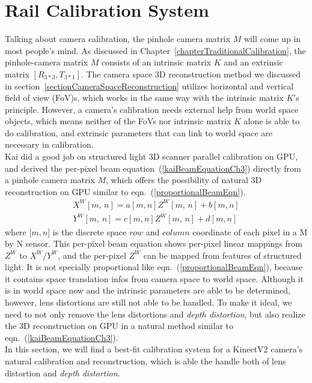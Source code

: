 \section{Rail Calibration System}
\label{sectionRailCalibrationSystem}
Talking about camera calibration, the pinhole camera matrix \(M\) will come up in most people's mind. As discussed in Chapter~\ref{chapterTraditionalCalibration}, the pinhole-camera matrix \(M\) consists of an intrinsic matrix \(K\) and an extrinsic matrix \([R_{3*3}, T_{3*1}]\). The camera space 3D reconstruction method we discussed in section~\ref{sectionCameraSpaceReconstruction} utilizes horizontal and vertical field of view (FoV)s, which works in the same way with the intrinsic matrix \(K\)'s principle. However, a camera's calibration needs external help from world space objects, which means neither of the FoVs nor intrinsic matrix \(K\) alone is able to do calibration,  and extrinsic parameters that can link to world space are necessary in calibration. 
\\\indent
Kai \cite{Kai10} did a good job on structured light 3D scanner parallel calibration on GPU, and derived the per-pixel beam equation~(\ref{kaiBeamEquationCh3}) directly from a pinhole camera matrix \(M\), which offers the possibility of natural 3D reconstruction on GPU similar to eqn.~(\ref{proportionalBeamEqn}).
%
\begin{equation}
\begin{aligned}
X^W[m,\,  n] = a[m, n]Z^W[m,\,  n]+b[m, n]
\\%
Y^W[m,\,  n] = c[m, n]Z^W[m,\,  n]+d[m, n]
\end{aligned}
\label{kaiBeamEquationCh3}
\end{equation}%
\noindent
where [\(m,n\)] is the discrete space \(row\) and \(column\) coordinate of each pixel in a M by N sensor. This per-pixel beam equation shows per-pixel linear mappings from \(Z^W\) to \(X^W/Y^W\), and the per-pixel \(Z^W\) can be mapped from features of structured light. It is not specially proportional like eqn.~(\ref{proportionalBeamEqn}), because it contains space translation infos from camera space to world space. Although it is in world space now and the intrinsic parameters are able to be determined, however, lens distortions are still not able to be handled. To make it ideal, we need to not only remove the lens distortions and \emph{depth distortion}, but also realize the 3D reconstruction on GPU in a natural method similar to eqn.~(\ref{kaiBeamEquationCh3}).
\\\indent
%
In this section, we will find a best-fit calibration system for a KinectV2 camera's natural calibration and reconstruction, which is able the handle both of lens distortion and \emph{depth distortion}. %
